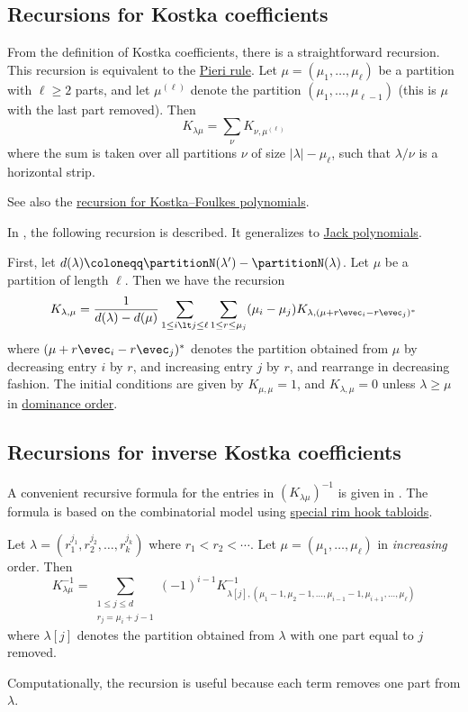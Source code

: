 \subsection[kostkaRecursion]{Recursions for Kostka coefficients}


From the definition of Kostka coefficients, there is a straightforward recursion.
This recursion is equivalent to the \hyperref[schurPieriRule]{Pieri rule}.
Let $\mu = (\mu_1,\dotsc,\mu_\ell)$ be a partition with $\ell \geq 2$ parts, and let $\mu^{(\ell)}$
denote the partition $(\mu_1,\dotsc,\mu_{\ell-1})$ (this is $\mu$ with the last part removed).
Then
\[
 K_{\lambda \mu} = \sum_{\nu} K_{\nu,\mu^{(\ell)}}
\]
where the sum is taken over all partitions $\nu$ of size $|\lambda|-\mu_\ell$,
such that $\lambda/\nu$ is a horizontal strip.

See also the \hyperref[kostkaIdentities]{recursion for Kostka--Foulkes polynomials}.


In \cite[p.~327]{Macdonald1995}, the following recursion is
described.  It generalizes to \hyperref[jackP]{Jack polynomials}.
\begin{theorem}
First, let $d(\lambda)\coloneqq \partitionN(\lambda')-\partitionN(\lambda)$.
Let $\mu$ be a partition of length $\ell$.
Then we have the recursion
\[
 K_{\lambda, \mu} 
=
\frac{1}{ d(\lambda) - d(\mu)}
 \sum_{1 \leq i \lt j \leq \ell}
 \sum_{1 \leq r \leq \mu_j}
 (\mu_i - \mu_j) K_{\lambda, (\mu+r \evec_i - r \evec_j)^*}
\]
where
$(\mu+r \evec_i - r \evec_j)^*$ denotes the partition
obtained from $\mu$ by decreasing entry $i$ by $r$,
and increasing entry $j$ by $r$, and
rearrange in decreasing fashion.
The initial conditions are given by $K_{\mu, \mu}=1$,
and $K_{\lambda, \mu}=0$ unless $\lambda \geq \mu$ in \hyperref[partialOrderingsOnPartitions]{dominance order}.
\end{theorem}



\subsection[kostkaInverseRecursion]{Recursions for inverse Kostka coefficients}

A convenient recursive formula for the entries in $(K_{\lambda\mu})^{-1}$
is given in \cite{EgeciogluRemmel1990}.  The formula is based on the
combinatorial model using
\hyperref[specialRimHookTabloid]{special rim hook tabloids}.

\begin{theorem}
Let $\lambda = (r_1^{j_1}, r_2^{j_2},\dotsc,r_k^{j_k})$ where $r_1 \lt r_2 \lt \dotsb$.
Let $\mu = (\mu_1,\dotsc,\mu_\ell)$ in \emph{increasing} order.
Then
\[
K^{-1}_{\lambda\mu} = \sum_{\substack{1 \leq j \leq d \\  r_j = \mu_i+j-1}} (-1)^{i-1}
K^{-1}_{\lambda[j], (\mu_1-1,\mu_2-1,\dotsc,\mu_{i-1}-1,\mu_{i+1},\dotsc,\mu_{\ell})}
\]
where $\lambda[j]$ denotes the partition obtained from $\lambda$ with one part equal to $j$ removed.
\end{theorem}
Computationally, the recursion is useful because each term removes one part
from $\lambda$.


